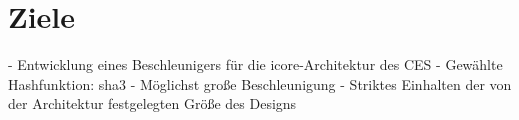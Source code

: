 \section{Ziele}

- Entwicklung eines Beschleunigers für die icore-Architektur des CES
- Gewählte Hashfunktion: sha3
- Möglichst große Beschleunigung
- Striktes Einhalten der von der Architektur festgelegten Größe des Designs
